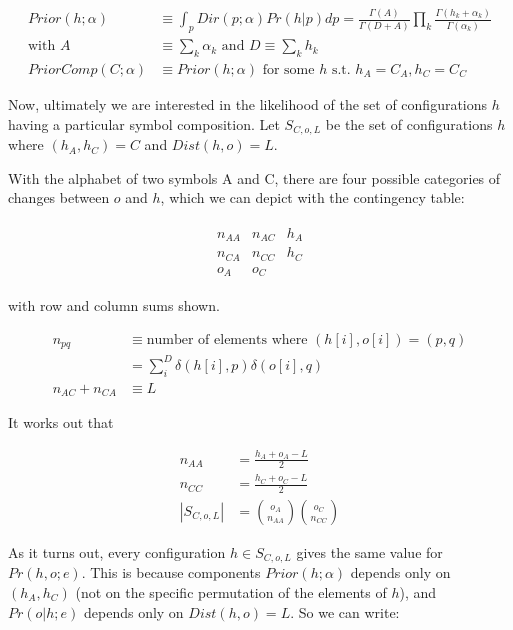 \documentclass{article}
\begin{document}
\begin{align}
Prior(h;\alpha) & \equiv \int_p{Dir(p;\alpha) Pr(h|p)dp}
= \frac{\Gamma(A)}{\Gamma(D+A)}
\prod_k \frac{\Gamma(h_k+\alpha_k)}{\Gamma(\alpha_k)} \\
\text{with } A & \equiv \sum_k \alpha_k \text{ and } D \equiv \sum_k h_k \nonumber \\
PriorComp(C;\alpha) & \equiv Prior(h;\alpha) \text{ for some } h \text{ s.t. } h_A = C_A, h_C = C_C
\end{align}

Now, ultimately we are interested in the likelihood of the set of
configurations $h$ having a particular symbol composition. Let
$S_{C,o,L}$ be the set of configurations $h$ where $(h_A,h_C) = C$ and
$Dist(h, o) = L$.

With the alphabet of two symbols A and C, there are four possible
categories of changes between $o$ and $h$, which we can depict with
the contingency table:

\begin{align*}
  \begin{matrix}
    n_{AA} & n_{AC} & h_A \\
    n_{CA} & n_{CC} & h_C \\
    o_A & o_C
  \end{matrix}
\end{align*}

with row and column sums shown.

\begin{align*}
  n_{pq} & \equiv \text{number of elements where } (h[i],o[i]) = (p,q) \\
  & = \sum_{i}^{D} \delta(h[i],p) \delta(o[i],q) \\
  n_{AC} + n_{CA} & \equiv L
\end{align*}

It works out that

\begin{align}
  n_{AA} & = \frac{h_A + o_A - L}{2} \nonumber \\
  n_{CC} & = \frac{h_C + o_C - L}{2} \nonumber \\
  |S_{C,o,L}| & = {o_A \choose n_{AA}} {o_C \choose n_{CC}}
\end{align}

As it turns out, every configuration $h \in S_{C,o,L}$ gives the same
value for $Pr(h, o; e)$.  This is because components $Prior(h;\alpha)$
depends only on $(h_A,h_C)$ (not on the specific permutation of the
elements of $h$), and $Pr(o|h;e)$ depends only on $Dist(h,o) = L$. So
we can write:
\end{document}
